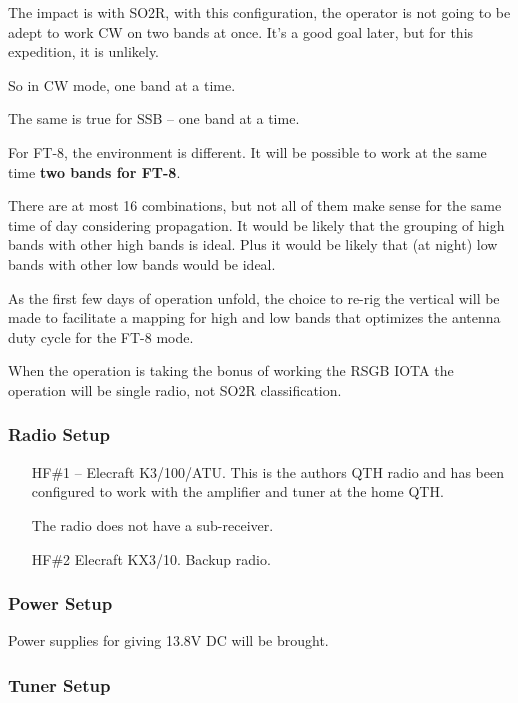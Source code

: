 \documentclass[11pt]{article}
\begin{document}
The impact is with SO2R, with this configuration, the operator is not
going to be adept to work CW on two bands at once.  It's a good goal
later, but for this expedition, it is unlikely. \par
So in CW mode, one band at a time.
\par

The same is true for SSB -- one band at a time.
\par

For FT-8, the environment is different.  It will be possible to work
at the same time {\textbf{two bands for FT-8}}. 
\par

There are at most 16 combinations, but not all of them make sense for
the same time of day considering propagation.  It would be likely that
the grouping of high bands with other high bands is ideal.  Plus it would
be likely that (at night) low bands with other low bands would be ideal.
\par

As the first few days of operation unfold, the choice to re-rig the
vertical will be made to facilitate a mapping for high and low bands
that optimizes the antenna duty cycle for the FT-8 mode.
\par

When the operation is taking the bonus of working the RSGB IOTA
the operation will be single radio, not SO2R classification.

\subsubsection{Radio Setup}

\begin{itemize}
\item[HF\#1] -- Elecraft K3/100/ATU.  This is the authors QTH radio and has been configured to work with the amplifier and tuner at the home QTH.
\par
The radio does not have a sub-receiver.
\item[HF\#2] Elecraft KX3/10.  Backup radio.
\end{itemize}

\subsubsection{Power Setup}

Power supplies for giving 13.8V DC will be brought.

\subsubsection{Tuner Setup}
\end{document}
